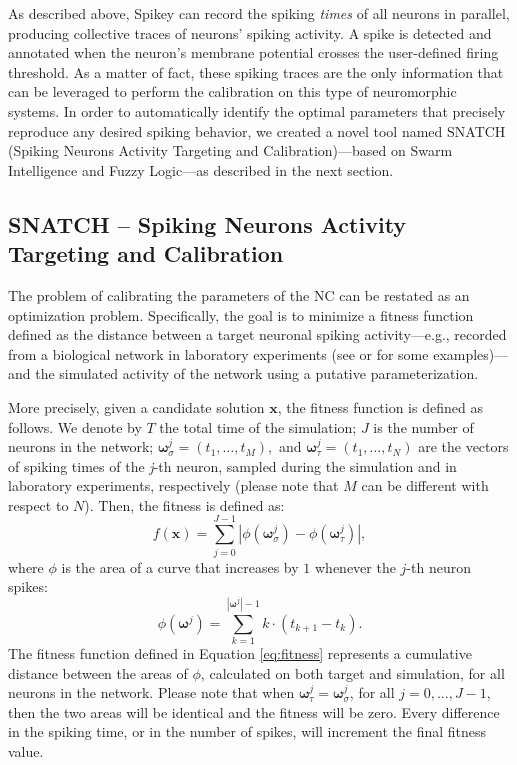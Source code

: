 \documentclass[utf8]{frontiersFPHY} %
\newcommand {\name}{SNATCH}
\begin{document}
As described above, Spikey can record the spiking \emph{times} of all neurons in parallel, producing collective traces of neurons' spiking activity.
A spike is detected and annotated when the neuron's membrane potential crosses the user-defined firing threshold. 
As a matter of fact, these spiking traces are the only information that can be leveraged to perform the calibration on this type of neuromorphic systems.
In order to automatically identify the optimal parameters that precisely reproduce any desired spiking behavior, we created a novel tool named \name{} (Spiking Neurons Activity Targeting and Calibration)---based on Swarm Intelligence and Fuzzy Logic---as described in the next section.


\subsection{SNATCH -- Spiking Neurons Activity Targeting and Calibration} 
The problem of calibrating the parameters of the NC can be restated as an optimization problem.
Specifically, the goal is to minimize a fitness function defined as the distance between a target neuronal spiking activity---e.g., recorded from a biological network in laboratory experiments (see \cite{} or \cite{} for some  examples)---and the simulated activity of the network using a putative parameterization. 

More precisely, given a candidate solution $\textbf{x}$, the fitness function is defined as follows. 
We denote by $T$ the total time of the simulation;  $J$ is the number of neurons in the network; $\boldsymbol{\omega}_{\sigma}^j = (t_1, \dots, t_M), $ and $\boldsymbol{\omega}_{\tau}^j = (t_1, \dots, t_N)$ are the vectors of spiking times of the \textit{j}-th neuron, sampled during the simulation and in laboratory experiments, respectively (please note that $M$ can be different with respect to $N$). 
Then, the fitness is defined as:
\begin{equation}
f(\textbf{x}) = \displaystyle \sum_{j=0}^{J-1} \left|\phi(\boldsymbol{\omega}_{\sigma}^j) - \phi(\boldsymbol{\omega}_{\tau}^j)\right|,
\label{eq:fitness}
\end{equation}
where $\phi$ is the area of a curve that increases by $1$ whenever the $j$-th neuron spikes:
\begin{equation}
    \phi(\boldsymbol{\omega}^j) = \sum_{k=1}^{|\boldsymbol{\omega}^j|-1} k \cdot ( t_{k+1} - t_k ).
\end{equation}
The fitness function defined in Equation \ref{eq:fitness} represents a cumulative distance between the areas of $\phi$, calculated on both target and simulation, for all neurons in the network. 
Please note that when $\boldsymbol{\omega}_{\tau}^j = \boldsymbol{\omega}_{\sigma}^j$, for all $j=0, \dots, J-1$, then the two areas will be identical and the fitness will be zero.
Every difference in the spiking time, or in the number of spikes, will increment the final fitness value.
\end{document}
